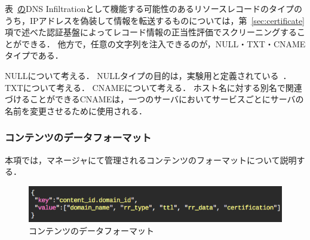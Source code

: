 表~\href{tab:infil-rtype}のDNS Infiltrationとして機能する可能性のあるリソースレコードのタイプのうち，IPアドレスを偽装して情報を転送するものについては，第~\ref{sec:certificate}項で述べた認証基盤によってレコード情報の正当性評価でスクリーニングすることができる．
他方で，任意の文字列を注入できるのが，NULL・TXT・CNAMEタイプである．

NULLについて考える．
NULLタイプの目的は，実験用と定義されている~\cite{rfc1035}．
TXTについて考える．
CNAMEについて考える．
ホスト名に対する別名で関連づけることができるCNAMEは，一つのサーバにおいてサービスごとにサーバの名前を変更させるために使用される．


\subsubsection{コンテンツのデータフォーマット}
本項では，マネージャにて管理されるコンテンツのフォーマットについて説明する．

\begin{figure}[h]
 \centering
 \includegraphics[scale=0.6]{figure/content-file.png}
 \caption{コンテンツのデータフォーマット}
 \label{fig:manager-provider}
\end{figure}

%
